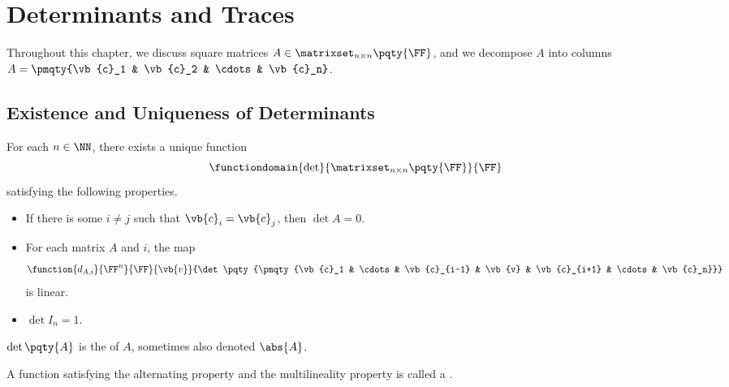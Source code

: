 \section{Determinants and Traces}

Throughout this chapter, we discuss square matrices \(A \in \matrixset_{n \times n} \pqty{\FF}\), and we decompose \(A\) into columns \(A = \pmqty{\vb{c}_1 & \vb{c}_2 & \cdots & \vb{c}_n}\).

\subsection{Existence and Uniqueness of Determinants}

\begin{theorem}
    \label{thm:determinant-existence-uniqueness}%
    For each \(n \in \NN\), there exists a unique function
    \[
        \functiondomain{\det}{\matrixset_{n \times n} \pqty{\FF}}{\FF}
    \]
    satisfying the following properties.

    \begin{itemize}
        \item {} If there is some \(i \neq j\) such that \(\vb{c}_i = \vb{c}_j\), then \(\det A = 0\).
        \item {} For each matrix \(A\) and \(i\), the map
        \[
            \function{d_{A, i}}{\FF^n}{\FF}{\vb{v}}{\det\pqty{\pmqty{\vb{c}_1 & \cdots & \vb{c}_{i-1} & \vb{v} & \vb{c}_{i+1} & \cdots & \vb{c}_n}}}
        \]
        is linear.
        \item {} \(\det I_n = 1\).
    \end{itemize}
\end{theorem}

\begin{definition}
    \(\det\pqty{A}\) is the  of \(A\), sometimes also denoted \(\abs{A}\).

    A function satisfying the alternating property and the multilineality property is called a .
\end{definition}

